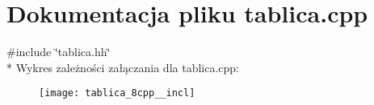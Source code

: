 \section{Dokumentacja pliku tablica.\+cpp}
\label{tablica_8cpp}
{\ttfamily \#include \char`\"{}tablica.\+hh\char`\"{}}\\*
Wykres zależności załączania dla tablica.\+cpp\+:\nopagebreak
\begin{figure}[H]
\begin{center}
\leavevmode
\texttt{[image: tablica\_8cpp\_\_incl]}
\end{center}
\end{figure}
